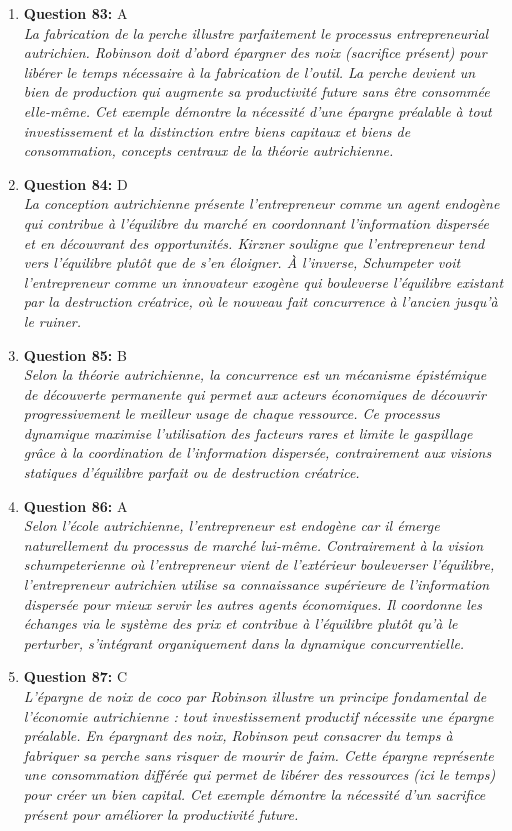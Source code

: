 \documentclass[12pt,a4paper]{article}
\begin{document}
\begin{enumerate}
\item \textbf{Question 83:} A
\\ \textit{La fabrication de la perche illustre parfaitement le processus entrepreneurial autrichien. Robinson doit d'abord épargner des noix (sacrifice présent) pour libérer le temps nécessaire à la fabrication de l'outil. La perche devient un bien de production qui augmente sa productivité future sans être consommée elle-même. Cet exemple démontre la nécessité d'une épargne préalable à tout investissement et la distinction entre biens capitaux et biens de consommation, concepts centraux de la théorie autrichienne.}

\item \textbf{Question 84:} D
\\ \textit{La conception autrichienne présente l'entrepreneur comme un agent endogène qui contribue à l'équilibre du marché en coordonnant l'information dispersée et en découvrant des opportunités. Kirzner souligne que l'entrepreneur tend vers l'équilibre plutôt que de s'en éloigner. À l'inverse, Schumpeter voit l'entrepreneur comme un innovateur exogène qui bouleverse l'équilibre existant par la destruction créatrice, où le nouveau fait concurrence à l'ancien jusqu'à le ruiner.}

\item \textbf{Question 85:} B
\\ \textit{Selon la théorie autrichienne, la concurrence est un mécanisme épistémique de découverte permanente qui permet aux acteurs économiques de découvrir progressivement le meilleur usage de chaque ressource. Ce processus dynamique maximise l'utilisation des facteurs rares et limite le gaspillage grâce à la coordination de l'information dispersée, contrairement aux visions statiques d'équilibre parfait ou de destruction créatrice.}

\item \textbf{Question 86:} A
\\ \textit{Selon l'école autrichienne, l'entrepreneur est endogène car il émerge naturellement du processus de marché lui-même. Contrairement à la vision schumpeterienne où l'entrepreneur vient de l'extérieur bouleverser l'équilibre, l'entrepreneur autrichien utilise sa connaissance supérieure de l'information dispersée pour mieux servir les autres agents économiques. Il coordonne les échanges via le système des prix et contribue à l'équilibre plutôt qu'à le perturber, s'intégrant organiquement dans la dynamique concurrentielle.}

\item \textbf{Question 87:} C
\\ \textit{L'épargne de noix de coco par Robinson illustre un principe fondamental de l'économie autrichienne : tout investissement productif nécessite une épargne préalable. En épargnant des noix, Robinson peut consacrer du temps à fabriquer sa perche sans risquer de mourir de faim. Cette épargne représente une consommation différée qui permet de libérer des ressources (ici le temps) pour créer un bien capital. Cet exemple démontre la nécessité d'un sacrifice présent pour améliorer la productivité future.}


\end{enumerate}
\end{document}
